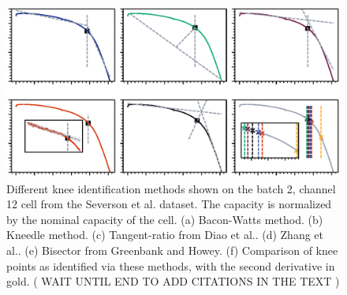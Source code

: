 \documentclass[journal=jpclcd,manuscript=article]{achemso}
\begin{document}
\begin{figure}[h!tb]
\centering
\includegraphics[scale=1]{figures/knee_identification_methods.eps}
\caption{Different knee identification methods shown on the batch 2, channel 12 cell from the Severson et al.\cite{severson_data-driven_2019} dataset. The capacity is normalized by the nominal capacity of the cell.
(a) Bacon-Watts \cite{fermin-cueto_identification_2020} method.
(b) Kneedle \cite{satopaa_finding_2011} method.
(c) Tangent-ratio from Diao et al.\cite{diao_algorithm_2019}.
(d) Zhang et al.\cite{zhang_identifying_2020}.
(e) Bisector from Greenbank and Howey.\cite{greenbank_automated_nodate}
(f) Comparison of knee points as identified via these methods, with the second derivative in gold.
(
WAIT UNTIL END TO ADD CITATIONS IN THE TEXT )}
\label{fig:knee_identification_methods}
\end{figure}
\end{document}
